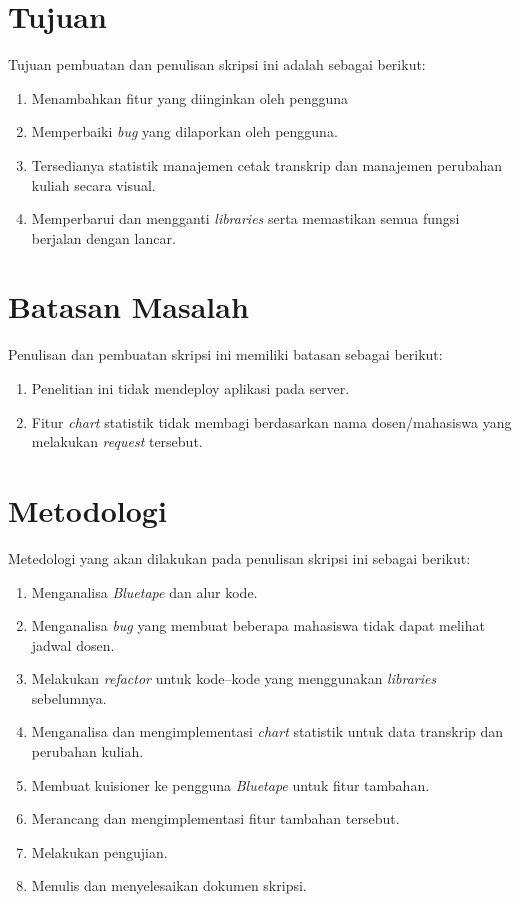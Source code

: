 \section{Tujuan}
\label{sec:tujuan}
Tujuan pembuatan dan penulisan skripsi ini adalah sebagai berikut:
\begin{enumerate}
	\item Menambahkan fitur yang diinginkan oleh pengguna
	\item Memperbaiki \textit{bug} yang dilaporkan oleh pengguna.
	\item Tersedianya statistik manajemen cetak transkrip dan manajemen perubahan kuliah secara visual.
	\item Memperbarui dan mengganti \textit{libraries} serta memastikan semua fungsi berjalan dengan lancar.

\end{enumerate}

\section{Batasan Masalah}
\label{sec:batasan}
Penulisan dan pembuatan skripsi ini memiliki batasan sebagai berikut:
\begin{enumerate}
	\item Penelitian ini tidak mendeploy aplikasi pada server.
	\item Fitur \textit{chart} statistik tidak membagi berdasarkan nama dosen/mahasiswa yang melakukan \textit{request} tersebut.
	
\end{enumerate}


\section{Metodologi}
\label{sec:metlit}
Metedologi yang akan dilakukan pada penulisan skripsi ini sebagai berikut:

\begin{enumerate}
	\item Menganalisa \textit{Bluetape} dan alur kode.
	\item Menganalisa \textit{bug} yang membuat beberapa mahasiswa tidak dapat melihat jadwal dosen.
	\item Melakukan \textit{refactor} untuk kode--kode yang menggunakan \textit{libraries} sebelumnya.
	\item Menganalisa dan mengimplementasi \textit{chart} statistik untuk data transkrip dan perubahan kuliah.
	\item Membuat kuisioner ke pengguna \textit{Bluetape} untuk fitur tambahan.
	\item Merancang dan mengimplementasi fitur tambahan tersebut.
	\item Melakukan pengujian.
	\item Menulis dan menyelesaikan dokumen skripsi.
\end{enumerate}

